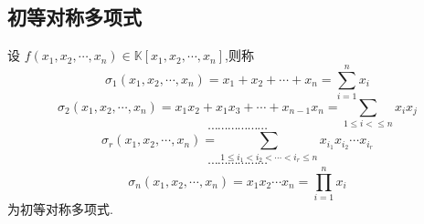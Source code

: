 \subsection{初等对称多项式}
\begin{formal}
\begin{definition}[初等对称多项式]\label{def:初等对称多项式}
    设 $f\left(
        x_1,x_2,\cdots,x_n
    \right)\in\mathbb{K}\left[
        x_1,x_2,\cdots,x_n
    \right]$,则称
    \[
        \sigma_1\left(
            x_1,x_2,\cdots,x_n
        \right)=x_1+x_2+\cdots+x_n=
        \sum_{i=1}^{n}x_i\]\[
        \sigma_2\left(
            x_1,x_2,\cdots,x_n
        \right)=x_1x_2+x_1x_3+\cdots+x_{n-1}x_n=
        \sum_{1\leqslant i<\leqslant n}x_ix_j\]\[
        \cdots\cdots\cdots\cdots\cdots\cdots\]
        \[
        \sigma_r\left(
            x_1,x_2,\cdots,x_n
        \right)=
        \sum_{1\leqslant i_1<i_2<\cdots<i_r\leqslant n}x_{i_1}x_{i_2}\cdots x_{i_r}
        \]
        \[
        \cdots\cdots \cdots\cdots\cdots\cdots
        \]
        \[\sigma_n\left(
            x_1,x_2,\cdots,x_n
        \right)=x_1x_2\cdots x_n=
        \prod_{i=1}^{n}x_i
    \]
    为初等对称多项式.
\end{definition}
\end{formal}
